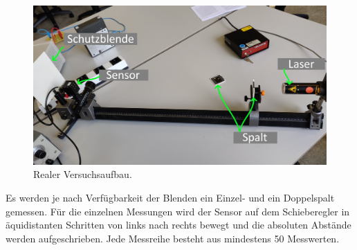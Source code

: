 \begin{figure}
    \centering
    \includegraphics[width=\textwidth]{plots/tatVersuchsaufbau.jpg}
    \caption{Realer Versuchsaufbau.}
    \label{fig:tatVersuchsaufbau}
\end{figure}

Es werden je nach Verfügbarkeit der Blenden ein Einzel- und ein Doppelspalt gemessen.
Für die einzelnen Messungen wird der Sensor auf dem Schieberegler in äquidistanten Schritten von links nach rechts bewegt und die absoluten Abstände werden aufgeschrieben.
Jede Messreihe besteht aus mindestens 50 Messwerten.